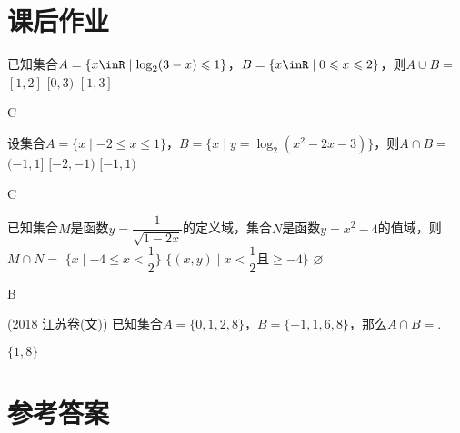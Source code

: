 \section{课后作业}
  \begin{exercise}
    \item %
      已知集合$A=\{x\inR\mid \log_2(3-x)\leqslant 1\}$，$B=\{x\inR\mid 0\leqslant x\leqslant 2\}$，则$A\cup B=$\xz
      \xx{$[0,3]$}
       {$[1,2]$}
       {$[0,3)$}
       {$[1,3]$}
      \begin{answer}
        C
      \end{answer}
    \item %
      设集合$A=\{x\mid -2\leqslant x\leqslant 1\}$，$B=\{x\mid y=\log_2{(x^2-2x-3)}\}$，则$A\cap B=$\xz
      \xx{$[-2,1)$}
       {$(-1,1]$}
       {$[-2,-1)$}
       {$[-1,1)$}
      \begin{answer}
        C
      \end{answer}
    \item %
      已知集合$M$是函数$y=\dfrac1{\sqrt{1-2x}}$的定义域，集合$N$是函数$y=x^2-4$的值域，则$M\cap N=$\xz
       {$\{x\mid -4\leqslant x< \dfrac12\}$}
       {$\{(x,y)\mid x< \dfrac12\text{且}\geqslant -4\}$}
       {$\varnothing$}
      \begin{answer}
        B
      \end{answer}
    \item %
      {\kaishu (2018 \textbullet 江苏卷(文))}
      已知集合$A=\{0,1,2,8\}$，$B=\{-1,1,6,8\}$，那么$A\cap B=$\tk.
      \begin{answer}
        $\{1,8\}$
      \end{answer}
  \end{exercise}
\stopexercise

\newpage
\section{参考答案}
\begin{multicols}{2}
  \printanswer
\end{multicols}
